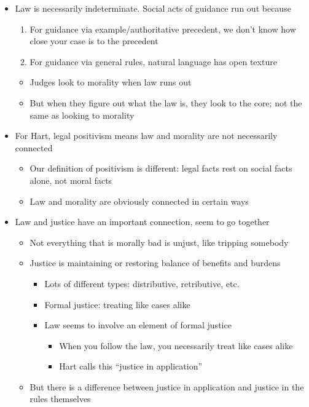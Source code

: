 \begin{itemize}
\tightlist
\item
  Law is necessarily indeterminate. Social acts of guidance run out
  because

  \begin{enumerate}
  \def\labelenumi{\arabic{enumi}.}
  \tightlist
  \item
    For guidance via example/authoritative precedent, we don't know how
    close your case is to the precedent
  \item
    For guidance via general rules, natural language has open texture
  \end{enumerate}

  \begin{itemize}
  \tightlist
  \item
    Judges look to morality when law runs out
  \item
    But when they figure out what the law is, they look to the core; not
    the same as looking to morality
  \end{itemize}
\item
  For Hart, legal positivism means law and morality are not necessarily
  connected

  \begin{itemize}
  \tightlist
  \item
    Our definition of positivism is different: legal facts rest on
    social facts alone, not moral facts
  \item
    Law and morality are obviously connected in certain ways
  \end{itemize}
\item
  Law and justice have an important connection, seem to go together

  \begin{itemize}
  \tightlist
  \item
    Not everything that is morally bad is unjust, like tripping somebody
  \item
    Justice is maintaining or restoring balance of benefits and burdens

    \begin{itemize}
    \tightlist
    \item
      Lots of different types: distributive, retributive, etc.
    \item
      Formal justice: treating like cases alike
    \item
      Law seems to involve an element of formal justice

      \begin{itemize}
      \tightlist
      \item
        When you follow the law, you necessarily treat like cases alike
      \item
        Hart calls this ``justice in application''
      \end{itemize}
    \end{itemize}
  \item
    But there is a difference between justice in application and justice
    in the rules themselves


\end{itemize}
\end{itemize}
